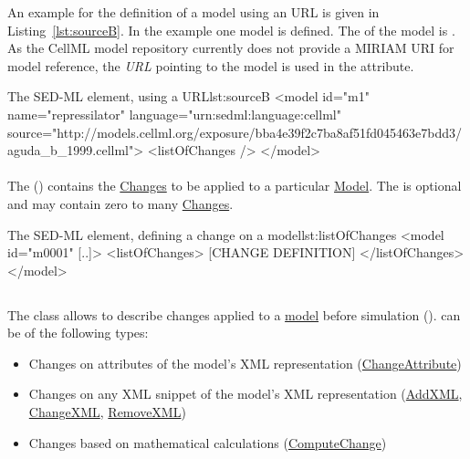 An example for the definition of a model using an URL is given in Listing~\ref{lst:sourceB}. In the example one model is defined. The  of the model is . As the CellML model repository currently does not provide a MIRIAM URI for model reference, the \emph{URL} pointing to the model is used in the  attribute.

\begin{myXmlLst}{The SED-ML  element, using a URL}{lst:sourceB}
<model id="m1" name="repressilator" language="urn:sedml:language:cellml" 
	source="http://models.cellml.org/exposure/bba4e39f2c7ba8af51fd045463e7bdd3/aguda_b_1999.cellml">
	<listOfChanges />
</model>
\end{myXmlLst}



\paragraph*{}
\label{sec:changesModel}
The  () contains the \hyperref[class:change]{Changes} to be applied to a particular \hyperref[class:model]{Model}. The  is optional and may contain zero to many \hyperref[class:change]{Changes}.

\begin{myXmlLst}{The SED-ML  element, defining a change on a model}{lst:listOfChanges}
<model id="m0001" [..]>
	<listOfChanges>
		[CHANGE DEFINITION]
	</listOfChanges>
</model>
\end{myXmlLst}

\subsection{}
\label{class:change}
The  class allows to describe changes applied to a \hyperref[class:model]{model} before simulation ().  can be of the following types:
\begin{itemize}
	\item{Changes on attributes of the model's XML representation (\hyperref[class:changeAttribute]{ChangeAttribute})}
	\item{Changes on any XML snippet of the model's XML representation (\hyperref[class:addXml]{AddXML}, \hyperref[class:changeXml]{ChangeXML}, \hyperref[class:removeXml]{RemoveXML})}
	\item{Changes based on mathematical calculations (\hyperref[class:computeChange]{ComputeChange})} 
\end{itemize}


